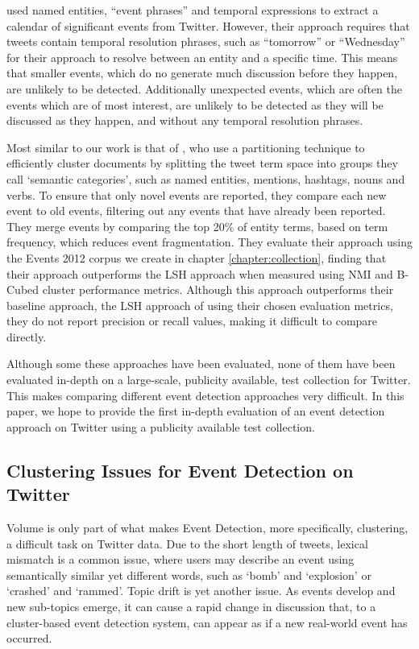 \cite{Ritter:2012:ODE:2339530.2339704} used named entities, ``event phrases'' and temporal expressions to extract a calendar of significant events from Twitter.
However, their approach requires that tweets contain temporal resolution phrases, such as ``tomorrow'' or ``Wednesday'' for their approach to resolve between an entity and a specific time.
This means that smaller events, which do no generate much discussion before they happen, are unlikely to be detected. Additionally unexpected events, which are often the events which are of most interest, are unlikely to be detected as they will be discussed as they happen, and without any temporal resolution phrases.

Most similar to our work is that of \cite{Reuters2017}, who use a partitioning technique to efficiently cluster documents by splitting the tweet term space into groups they call `semantic categories', such as named entities, mentions, hashtags, nouns and verbs.
To ensure that only novel events are reported, they compare each new event to old events, filtering out any events that have already been reported.
They merge events by comparing the top 20\% of entity terms, based on term frequency, which reduces event fragmentation.
They evaluate their approach using the Events 2012 corpus we create in chapter \ref{chapter:collection}, finding that their approach outperforms the LSH approach when measured using NMI and B-Cubed cluster performance metrics.
Although this approach outperforms their baseline approach, the LSH approach of \cite{Petrovic:2010:SFS:1857999.1858020} using their chosen evaluation metrics, they do not report precision or recall values, making it difficult to compare directly.

Although some these approaches have been evaluated, none of them have been evaluated in-depth on a large-scale, publicity available, test collection for Twitter. This makes comparing different event detection approaches very difficult. In this paper, we hope to provide the first in-depth evaluation of an event detection approach on Twitter using a publicity available test collection.

\subsection{Clustering Issues for Event Detection on Twitter}
Volume is only part of what makes Event Detection, more specifically, clustering, a difficult task on Twitter data.
Due to the short length of tweets, lexical mismatch is a common issue, where users may describe an event using semantically similar yet different words, such as `bomb' and `explosion' or `crashed' and `rammed'.
Topic drift is yet another issue.
As events develop and new sub-topics emerge, it can cause a rapid change in discussion that, to a cluster-based event detection system, can appear as if a new real-world event has occurred.

